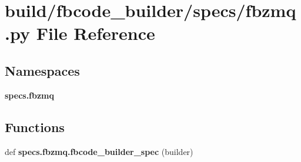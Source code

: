 \section{build/fbcode\+\_\+builder/specs/fbzmq.py File Reference}
\label{fbzmq_8py}
\subsection*{Namespaces}
\begin{DoxyCompactItemize}
\item 
 {\bf specs.\+fbzmq}
\end{DoxyCompactItemize}
\subsection*{Functions}
\begin{DoxyCompactItemize}
\item 
def {\bf specs.\+fbzmq.\+fbcode\+\_\+builder\+\_\+spec} (builder)
\end{DoxyCompactItemize}
